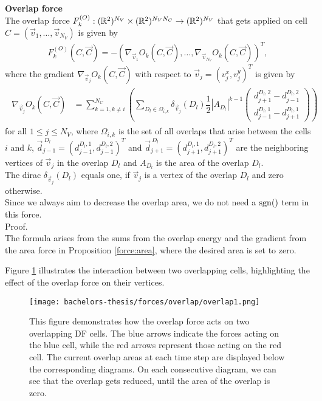 \begin{proposition} \textbf{Overlap force} \\
	The overlap force $F_{k}^{(O)}: (\mathbb{R}^2)^{N_V} \times (\mathbb{R}^2)^{N_V N_C} \rightarrow (\mathbb{R}^2)^{N_V}$ that gets applied on cell $C = (\vec{v}_1, \ldots, \vec{v}_{N_V})$ is given by  
	\begin{align*}
		F_{k}^{(O)}(C, \vec{C}) 
		= - (\nabla_{\vec{v}_1} O_k(C, \vec{C}), \ldots, \nabla_{\vec{v}_{N_V}} O_k(C, \vec{C}))^T,
	\end{align*}
	where the gradient $\nabla_{\vec{v}_j} O_k(C, \vec{C})$ with respect to $\vec{v}_j = (v_{j}^{x}, v_{j}^{y})^T$ is given by 
	\begin{align}
		\begin{split}
			\nabla_{\vec{v}_j} O_k(C, \vec{C}) &= \sum\limits_{k=1, k \neq i}^{N_C} \left( \sum\limits_{D_l \in \Omega_{i,k}} \delta_{\vec{v}_j}(D_l)  \dfrac{1}{2} |A_{D_l}|^{k-1} \begin{pmatrix} d_{j+1}^{D_l, 2} - d_{j-1}^{D_l, 2} \\[0.5em]  d_{j-1}^{D_l, 1} - d_{j+1}^{D_l, 1} \end{pmatrix} \right)
		\end{split}
		\label{gradient:overlap}
	\end{align}
	for all $1 \leq j \leq N_V$, where $\Omega_{i,k}$ is the set of all overlaps that arise between the cells $i$ and $k$, $\vec{d}_{j-1}^{\: D_l} = (d_{j-1}^{D_l, 1}, d_{j-1}^{D_l, 2})^T$ and $\vec{d}_{j+1}^{\: D_l} = (d_{j+1}^{D_l, 1}, d_{j+1}^{D_l, 2})^T$ are the neighboring vertices of $\vec{v}_j$ in the overlap $D_l$ and $A_{D_l}$ is the area of the overlap $D_l$.\\
	The dirac $\delta_{\vec{v}_j}(D_l)$ equals one, if $\vec{v}_j$ is a vertex of the overlap $D_l$ and zero otherwise. \\
	Since we always aim to decrease the overlap area, we do not need a $\operatorname{sgn}()$ term in this force. \\
	
	Proof. \\
	The formula arises from the sums from the overlap energy and the gradient from the area force in Proposition \ref{force:area}, where the desired area is set to zero. 
\end{proposition}

Figure \ref{fig:overlapForce} illustrates the interaction between two overlapping cells, highlighting the effect of the overlap force on their vertices.
\begin{figure}[h!]
	\begin{center}
		\texttt{[image: bachelors-thesis/forces/overlap/overlap1.png]}
			\caption{This figure demonstrates how the overlap force acts on two overlapping DF cells.
			The blue arrows indicate the forces acting on the blue cell, while the red arrows represent those acting on the red cell.
			The current overlap areas at each time step are displayed below the corresponding diagrams.			
			On each consecutive diagram, we can see that the overlap gets reduced, until the area of the overlap is zero.  }
			\label{fig:overlapForce}
	\end{center}
\end{figure}


